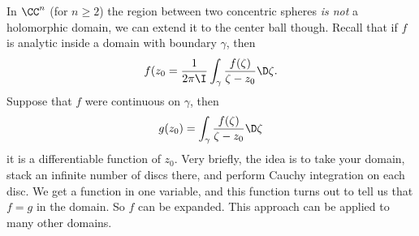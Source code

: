 In $\CC^{n}$ (for $n\geq2$) the region between two concentric
spheres \emph{is not} a holomorphic domain, we can extend it to
the center ball though. Recall that if $f$ is analytic inside a
domain with boundary $\gamma$, then
\begin{equation}
f(z_{0}=\frac{1}{2\pi\I}\int_{\gamma}\frac{f(\zeta)}{\zeta-z_{0}}\D\zeta.
\end{equation}
Suppose that $f$ were continuous on $\gamma$, then
\begin{equation}
g(z_{0})=\int_{\gamma}\frac{f(\zeta)}{\zeta-z_{0}}\D\zeta
\end{equation}
it is a differentiable function of $z_{0}$. Very briefly, the
idea is to take your domain, stack an infinite number of discs
there, and perform Cauchy integration on each disc. We get a
function in one variable, and this function turns out to tell us
that $f=g$ in the domain. So $f$ can be expanded. This approach
can be applied to many other domains.
